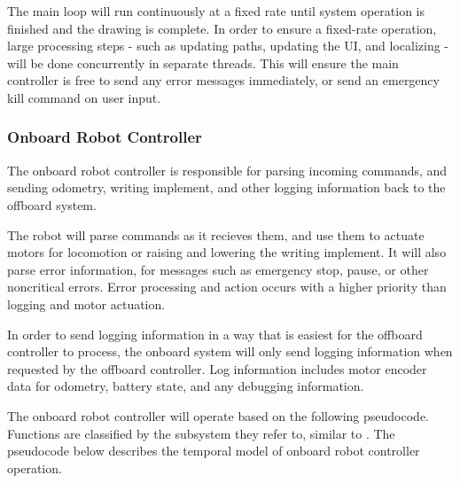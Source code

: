 The main loop will run continuously at a fixed rate until system operation is finished and the drawing is complete. In order to ensure a fixed-rate operation, large processing steps - such as updating paths, updating the UI, and localizing - will be done concurrently in separate threads. This will ensure the main controller is free to send any error messages immediately, or send an emergency kill command on user input.


\subsubsection{Onboard Robot Controller}
\label{sec:software_full_onboard}
The onboard robot controller is responsible for parsing incoming commands, and sending odometry, writing implement, and other logging information back to the offboard system.

The robot will parse commands as it recieves them, and use them to actuate motors for locomotion or raising and lowering the writing implement. It will also parse error information, for messages such as emergency stop, pause, or other noncritical errors. Error processing and action occurs with a higher priority than logging and motor actuation.

In order to send logging information in a way that is easiest for the offboard controller to process, the onboard system will only send logging information when requested by the offboard controller. Log information includes motor encoder data for odometry, battery state, and any debugging information.

The onboard robot controller will operate based on the following pseudocode. Functions are classified by the subsystem they refer to, similar to . The pseudocode below describes the temporal model of onboard robot controller operation.

